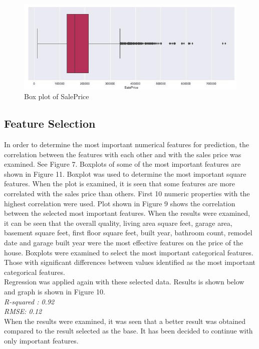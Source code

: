\documentclass[onecolumn]{article}
\begin{document}
\begin{figure}[h]
\centering
  \includegraphics[width=0.6\linewidth]{box_saleprice.jpg}
  \caption{Box plot of SalePrice}
  \label{fig:box_saleprice}
\end{figure}

\subsection{Feature Selection}
In order to determine the most important numerical features for prediction, the correlation between the features with each other and with the sales price was examined. See Figure 7. Boxplots of some of the most important features are shown in Figure 11. Boxplot was used to determine the most important square features. When the plot is examined, it is seen that some features are more correlated with the sales price than others. First 10 numeric properties with the highest correlation were used. Plot shown in Figure 9 shows the correlation between the selected most important features. When the results were examined, it can be seen that the overall quality, living area square feet, garage area, basement square feet, first floor square feet, built year, bathroom count, remodel date and garage built year were the most effective features on the price of the house. Boxplots were examined to select the most important categorical features. Those with significant differences between values identified as the most important categorical features.\\
Regression was applied again with these selected data. Results is shown below and graph is shown in Figure 10.\\
\textit{R-squared : 0.92\\
RMSE: 0.12}\\
When the results were examined, it was seen that a better result was obtained compared to the result selected as the base. It has been decided to continue with only important features.
\end{document}
